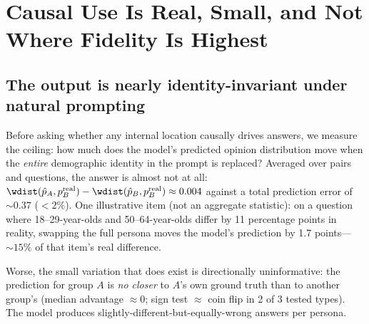 \section{Causal Use Is Real, Small, and Not Where Fidelity Is Highest}
\label{sec:gap}

\subsection{The output is nearly identity-invariant under natural prompting}
\label{sec:ceiling}
Before asking whether any internal location causally drives answers, we
measure the ceiling: how much does the model's predicted opinion
distribution move when the \emph{entire} demographic identity in the
prompt is replaced? Averaged over pairs and questions, the answer is
almost not at all: $\wdist(\hat{p}_A, p^{\mathrm{real}}_B) -
\wdist(\hat{p}_B, p^{\mathrm{real}}_B) \approx 0.004$ against a total
prediction error of ${\sim}0.37$ (${<}2\%$). One illustrative item (not
an aggregate statistic): on a question where 18--29-year-olds and
50--64-year-olds differ by 11 percentage points in reality, swapping the
full persona moves the model's prediction by 1.7 points---${\sim}15\%$ of
that item's real difference.

Worse, the small variation that does exist is directionally
uninformative: the prediction for group $A$ is \emph{no closer} to $A$'s
own ground truth than to another group's (median advantage
$\approx0$; sign test ${\approx}$ coin flip in 2 of 3 tested types).
The model produces slightly-different-but-equally-wrong answers per
persona. %

